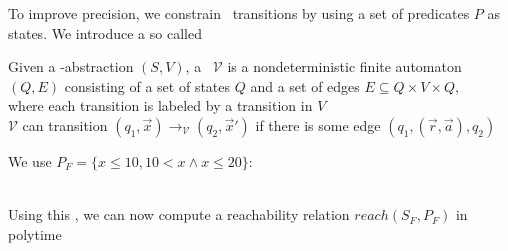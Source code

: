 \begin{frame}[t]
	\frametitle{\qvasrs}
	To improve precision, we constrain \qvasr\ transitions by using a set of predicates $P$ as states. We introduce a so called \qvasrs
	\begin{definition}
		Given a \qvasr-abstraction $(S,V)$, a \qvasrs\ $\mathcal{V}$ is a nondeterministic finite automaton $(Q, E)$ consisting of a set of states $Q$ and a set of edges $E \subseteq Q \times V \times Q$, \\
		where each transition is labeled by a transition in $V$ \\ \vspace*{0.25cm}
		$\mathcal{V}$ can transition $(q_1, \vec{x}) \rightarrow_\mathcal{V} (q_2, \vec{x}')$ if there is some edge $(q_1, (\vec{r}, \vec{a}), q_2)$
	\end{definition}
	\begin{center}
		We use $P_F = \{ x \leq 10, 10 < x \land x \leq 20\}:$
	\end{center} \vspace{0.5cm}
	
\end{frame}

\begin{frame}
	 \\
	Using this \qvasrs, we can now compute a reachability relation $reach(S_F, P_F)$ in polytime \cite{DBLP:conf/rp/HaaseH14}
\end{frame}